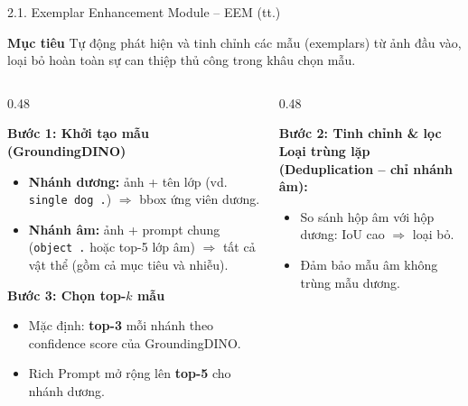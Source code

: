\documentclass[11pt]{beamer}
\begin{document}
\begin{frame}[shrink=10]{2.1. Exemplar Enhancement Module -- EEM (tt.)}
\scriptsize

\begin{block}{\textbf{Mục tiêu}}
Tự động phát hiện và tinh chỉnh các mẫu (exemplars) từ ảnh đầu vào, loại bỏ hoàn toàn sự can thiệp thủ công trong khâu chọn mẫu.
\end{block}

\vspace{0.3em}

\begin{columns}[T,onlytextwidth]
\begin{column}{0.48\textwidth}

\begin{block}{\textbf{Bước 1: Khởi tạo mẫu (GroundingDINO)}}
\begin{itemize}
  \item \textbf{Nhánh dương:} ảnh + tên lớp (vd. \texttt{single dog .}) $\Rightarrow$ bbox ứng viên dương.
  \item \textbf{Nhánh âm:} ảnh + prompt chung (\texttt{object .} hoặc top-5 lớp âm) $\Rightarrow$ tất cả vật thể (gồm cả mục tiêu và nhiễu).
\end{itemize}
\end{block}

\begin{block}{\textbf{Bước 3: Chọn top-$k$ mẫu}}
\begin{itemize}
  \item Mặc định: \textbf{top-3} mỗi nhánh theo confidence score của GroundingDINO.
  \item Rich Prompt mở rộng lên \textbf{top-5} cho nhánh dương.
\end{itemize}
\end{block}

\end{column}

\begin{column}{0.48\textwidth}

\begin{block}{\textbf{Bước 2: Tinh chỉnh \& lọc}}
\textbf{Loại trùng lặp (Deduplication -- chỉ nhánh âm):}
\begin{itemize}
  \item So sánh hộp âm với hộp dương: IoU cao $\Rightarrow$ loại bỏ.
  \item Đảm bảo mẫu âm không trùng mẫu dương.
\end{itemize}


\end{block}
\end{column}
\end{columns}
\end{frame}
\end{document}
